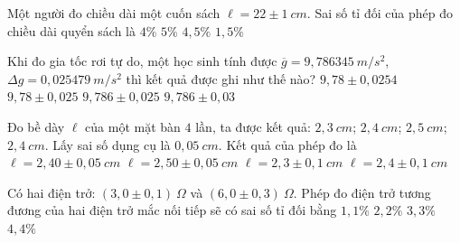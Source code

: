 \begin{ex}%
Một người đo chiều dài một cuốn sách $\ell=22 \pm 1\ cm$. Sai số tỉ đối của phép đo chiều dài quyển sách là
\choice
{$4\%$}
{$5\%$}
{\True $4,5\%$}
{$1,5\%$}
\loigiai{
}
\end{ex}
\begin{ex}%
Khi đo gia tốc rơi tự do, một học sinh tính được $\overline{g}=9,786345\ m/s^2$, $\Delta g=0,025479\ m/s^2$ thì kết quả được ghi như thế nào?
\choice
{$9,78 \pm 0,0254$}
{$9,78 \pm 0,025$}
{\True $9,786 \pm 0,025$}
{$9,786 \pm 0,03$}
\loigiai{
}
\end{ex}
\begin{ex}%
Đo bề dày $\ell$ của một mặt bàn $4$ lần, ta được kết quả: $2,3\ cm$; $2,4\ cm$; $2,5\ cm$; $2,4\ cm$. Lấy sai số dụng cụ là $0,05\ cm$. Kết quả của phép đo là
\choice
{$\ell=2,40 \pm 0,05\ cm$}
{$\ell=2,50 \pm 0,05\ cm$}
{$\ell=2,3 \pm 0,1\ cm$}
{\True $\ell=2,4 \pm 0,1\ cm$}
\loigiai{
}
\end{ex}
\begin{ex}%
Có hai điện trở: $(3,0 \pm 0,1)\ \Omega$ và $(6,0 \pm 0,3)\ \Omega$. Phép đo điện trở tương đương của hai điện trở mắc nối tiếp sẽ có sai số tỉ đối bằng
\choice
{$1,1\%$}
{$2,2\%$}
{$3,3\%$}
{\True $4,4\%$}
\end{ex}
